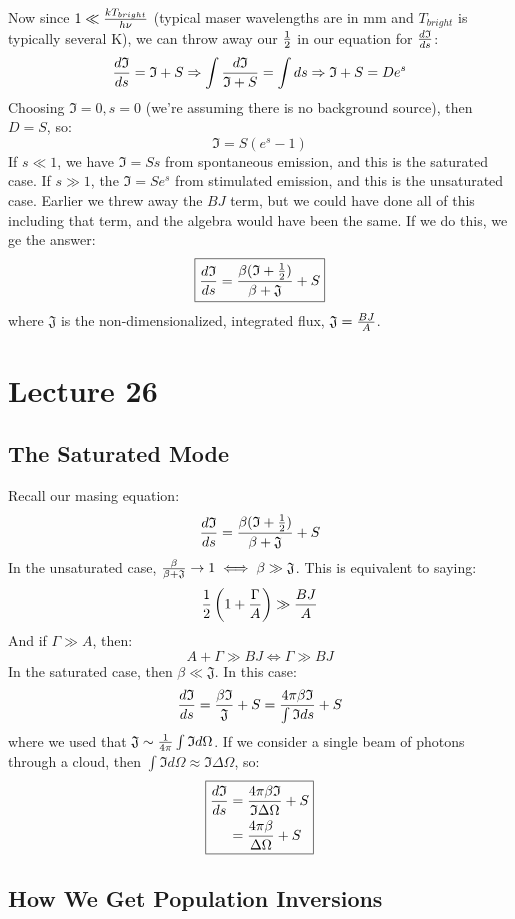 \documentclass[11pt]{article}
\def\hf{{1 \over 2}}
\def\imply{\Rightarrow}
\def\inv#1{{1 \over #1}}
\begin{document}
Now since $1\ll{kT_{bright}\over h\nu}$ (typical maser wavelengths are in
mm and $T_{bright}$ is typically several K), we can throw away our $\hf$ in
our equation for ${d\mathfrak{I}\over ds}$:
$${d\mathfrak{I}\over ds}=\mathfrak{I}+S\imply
\int{d\mathfrak{I}\over\mathfrak{I}+S}=\int{ds}\imply
\mathfrak{I}+S=De^s$$
Choosing $\mathfrak{I}=0, s=0$ (we're assuming there is no background source), then
$D=S$, so:
$$\boxed{\mathfrak{I}=S(e^s-1)}$$
If $s\ll1$, we have $\mathfrak{I}=Ss$ from spontaneous emission, and this is the 
saturated case.  If $s\gg1$, the $\mathfrak{I}=Se^s$ from stimulated emission, and
this is the unsaturated case.  Earlier we threw away the $BJ$ term, but we
could have done all of this including that term, and the algebra would have
been the same.  If we do this, we ge the answer:
$$\boxed{{d\mathfrak{I}\over ds}={\beta(\mathfrak{I}+\hf)\over\beta+\mathfrak{J}}+S}$$
where $\mathfrak{J}$ is the non-dimensionalized, integrated flux, 
$\mathfrak{J}={BJ\over A}$.

\section*{ Lecture 26 }

\subsection*{ The Saturated Mode }

Recall our masing equation:
$${d\mathfrak{I}\over ds}={\beta(\mathfrak{I}+\hf)\over\beta+\mathfrak{J}}+S$$
In the unsaturated case, ${\beta\over\beta+\mathfrak{J}}\to1\iff\beta\gg\mathfrak{J}$.
This is equivalent to saying:
$$\hf\left(1+{\Gamma\over A}\right)\gg{BJ\over A}$$
And if $\Gamma\gg A$, then:
$$A+\Gamma\gg BJ\iff\Gamma\gg BJ$$
In the saturated case, then $\beta\ll\mathfrak{J}$.  In this case:
$${d\mathfrak{I}\over ds}={\beta\mathfrak{I}\over\mathfrak{J}}+S={4\pi\beta\mathfrak{I}\over
\int{\mathfrak{I}ds}}+S$$
where we used that $\mathfrak{J}\sim\inv{4\pi}\int{\mathfrak{I}d\Omega}$.  If we consider
a single beam of photons through a cloud, then $\int{\mathfrak{I}d\Omega}\approx
\mathfrak{I}\Delta\Omega$, so:
$$\boxed{
\begin{aligned}{d\mathfrak{I}\over ds}&={4\pi\beta\mathfrak{I}\over\mathfrak{I}\Delta\Omega}+S\\ 
&={4\pi\beta\over\Delta\Omega}+S\\ \end{aligned}}$$

\subsection*{ How We Get Population Inversions }
\end{document}
